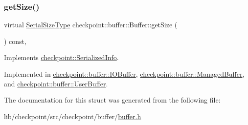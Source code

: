 \subsubsection{\texorpdfstring{get\+Size()}{getSize()}}
{\footnotesize\ttfamily virtual \hyperlink{namespacecheckpoint_a083f6674da3f94c2901b18c6d238217c}{Serial\+Size\+Type} checkpoint\+::buffer\+::\+Buffer\+::get\+Size (\begin{DoxyParamCaption}{ }\end{DoxyParamCaption}) const\hspace{0.3cm}{\ttfamily [override]}, {}}



Implements \hyperlink{structcheckpoint_1_1_serialized_info_a7550340904d20dd612100fb37d1d4452}{checkpoint\+::\+Serialized\+Info}.



Implemented in \hyperlink{structcheckpoint_1_1buffer_1_1_i_o_buffer_a65774dab5b6397ae40b77282729fde2f}{checkpoint\+::buffer\+::\+I\+O\+Buffer}, \hyperlink{structcheckpoint_1_1buffer_1_1_managed_buffer_a26f85bcd885624b7c0ad6fd8572ad466}{checkpoint\+::buffer\+::\+Managed\+Buffer}, and \hyperlink{structcheckpoint_1_1buffer_1_1_user_buffer_a434e7feda041957509ee08791d3f4949}{checkpoint\+::buffer\+::\+User\+Buffer}.



The documentation for this struct was generated from the following file\+:\begin{DoxyCompactItemize}
\item 
lib/checkpoint/src/checkpoint/buffer/\hyperlink{buffer_8h}{buffer.\+h}\end{DoxyCompactItemize}
